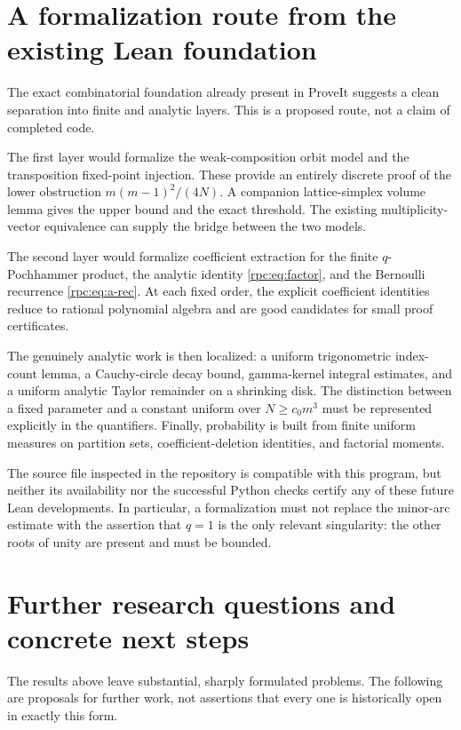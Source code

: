 \documentclass[11pt]{article}
\theoremstyle{definition}
\theoremstyle{remark}
\numberwithin{equation}{section}
\begin{document}
\section{A formalization route from the existing Lean foundation}

The exact combinatorial foundation already present in ProveIt suggests a
clean separation into finite and analytic layers. This is a proposed route,
not a claim of completed code.

The first layer would formalize the weak-composition orbit model and the
transposition fixed-point injection. These provide an entirely discrete proof
of the lower obstruction $m(m-1)^2/(4N)$. A companion lattice-simplex volume
lemma gives the upper bound and the exact threshold. The existing
multiplicity-vector equivalence can supply the bridge between the two models.

The second layer would formalize coefficient extraction for the finite
$q$-Pochhammer product, the analytic identity \eqref{rpc:eq:factor}, and the
Bernoulli recurrence \eqref{rpc:eq:a-rec}. At each fixed order, the explicit
coefficient identities reduce to rational polynomial algebra and are good
candidates for small proof certificates.

The genuinely analytic work is then localized: a uniform trigonometric
index-count lemma, a Cauchy-circle decay bound, gamma-kernel integral estimates,
and a uniform analytic Taylor remainder on a shrinking disk. The distinction
between a fixed parameter and a constant uniform over $N\ge c_0m^3$ must be
represented explicitly in the quantifiers. Finally, probability is built from
finite uniform measures on partition sets, coefficient-deletion identities,
and factorial moments.

The source file inspected in the repository is compatible with this program,
but neither its availability nor the successful Python checks certify any
of these future Lean developments. In particular, a formalization must not
replace the minor-arc estimate with the assertion that $q=1$ is the only
relevant singularity: the other roots of unity are present and must be bounded.

\section{Further research questions and concrete next steps}\label{rpc:sec:research}

The results above leave substantial, sharply formulated problems. The following
are proposals for further work, not assertions that every one is historically
open in exactly this form.
\end{document}
